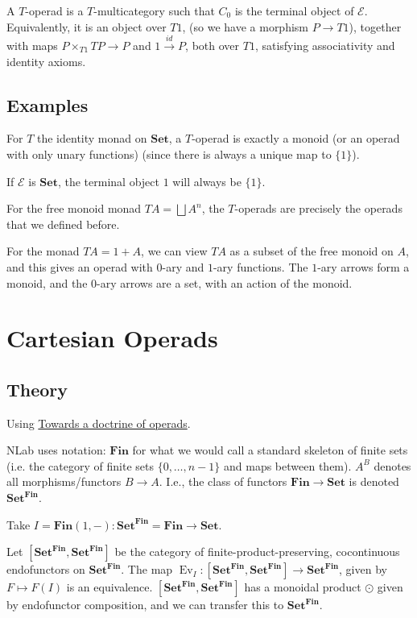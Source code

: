 \documentclass{amsbook}
\newcommand{\Catb}[1]{\mathbf{#1}}
\newcommand{\SET}{\Catb{Set}}
\newcommand{\FIN}{\Catb{Fin}}
\newcommand{\Hom}[3]{{#1}\left(#2,#3\right)}
\theoremstyle{definition}
\begin{document}
  A $ T $-operad is a $ T $-multicategory such that $ C_0 $ is the terminal object of $ \mathcal E $. Equivalently, it is an object over $ T 1 $, (so we have a morphism $ P \to T 1 $), together with maps $ P \times_{T 1} T P \to P $ and $ 1 \xrightarrow{id} P $, both over $ T 1 $, satisfying associativity and identity axioms.

  \subsection{Examples}
  For $ T $ the identity monad on $ \SET $, a $ T $-operad is exactly a monoid (or an operad with only unary functions) (since there is always a unique map to $ \{ 1 \} $).

  If $ \mathcal E $ is $ \SET $, the terminal object $ 1 $ will always be $ \{ 1 \} $.

  For the free monoid monad $ T A = \bigsqcup A^n $, the $ T $-operads are precisely the operads that we defined before.

  For the monad $ T A = 1 + A $, we can view $ T A $ as a subset of the free monoid on $ A $, and this gives an operad with $ 0 $-ary and $ 1 $-ary functions. The $ 1 $-ary arrows form a monoid, and the $ 0 $-ary arrows are a set, with an action of the monoid.

  \section{Cartesian Operads}
  \subsection{Theory}
  Using \href{https://ncatlab.org/toddtrimble/published/Towards+a+doctrine+of+operads}{Towards a doctrine of operads}.

  NLab uses notation: $ \FIN $ for what we would call a standard skeleton of finite sets (i.e. the category of finite sets $ \{ 0, \dots, n - 1 \} $ and maps between them). $ A^B $ denotes all morphisms/functors $ B \to A $. I.e., the class of functors $ \FIN \to \SET $ is denoted $ \SET^\FIN $.

  Take $ I = \Hom{\FIN}{1}{-}: \SET^\FIN = \FIN \to \SET $.

  Let $ [\SET^\FIN, \SET^\FIN] $ be the category of finite-product-preserving, cocontinuous endofunctors on $ \SET^\FIN $. The map $ \mathop{Ev}_I: [\SET^\FIN, \SET^\FIN] \to \SET^\FIN $, given by $ F \mapsto F(I) $ is an equivalence. $ [\SET^\FIN, \SET^\FIN] $ has a monoidal product $ \odot $ given by endofunctor composition, and we can transfer this to $ \SET^\FIN $.
\end{document}
